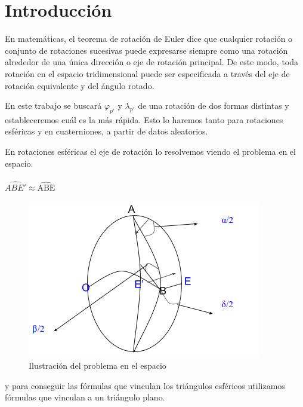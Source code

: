 \documentclass[spanish]{article}
\begin{document}

  \section{Introducción}
  
  
  En matemáticas, el teorema de rotación de Euler dice que cualquier
rotación o conjunto de rotaciones sucesivas puede expresarse siempre
como una rotación alrededor de una única dirección o eje de rotación
principal. De este modo, toda rotación en el espacio tridimensional
puede ser especificada a través del eje de rotación equivalente y del
ángulo rotado.

En este trabajo se buscará \(\varphi_{p'}\) y \(\lambda_{p'}\) de una
rotación de dos formas distintas y estableceremos cuál es la más rápida.
Esto lo haremos tanto para rotaciones esféricas y en cuaterniones, a
partir de datos aleatorios.

En rotaciones esféricas el eje de rotación lo resolvemos viendo el
problema en el espacio.\\
\\

 \(\widehat{ABE'} \approx \widehat{\text{ABE}}\)
 
\begin{figure}[H]
  \centering
    \includegraphics{1.png}
  \caption{Ilustración del problema en el espacio}
  \label{fig:ejemplo}
\end{figure}


y para conseguir las fórmulas que vinculan los triángulos esféricos
utilizamos fórmulas que vinculan a un triángulo plano.\\
\end{document}
